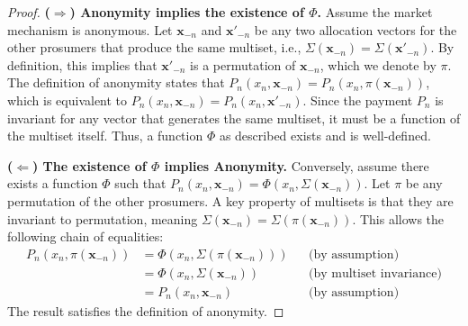 \documentclass[12pt, notitlepage]{article}
\begin{document}
\begin{proof}
\textbf{($\Rightarrow$) Anonymity implies the existence of $\Phi$.}
Assume the market mechanism is anonymous. Let $\bm{x}_{-n}$ and $\bm{x}'_{-n}$ be any two allocation vectors for the other prosumers that produce the same multiset, i.e., $\Sigma(\bm{x}_{-n}) = \Sigma(\bm{x}'_{-n})$. By definition, this implies that $\bm{x}'_{-n}$ is a permutation of $\bm{x}_{-n}$, which we denote by $\pi$. The definition of anonymity states that $P_n(x_n, \bm{x}_{-n}) = P_n(x_n, \pi(\bm{x}_{-n}))$, which is equivalent to $P_n(x_n, \bm{x}_{-n}) = P_n(x_n, \bm{x}'_{-n})$. Since the payment $P_n$ is invariant for any vector that generates the same multiset, it must be a function of the multiset itself. Thus, a function $\Phi$ as described exists and is well-defined.

\vspace{\baselineskip}

\noindent\textbf{($\Leftarrow$) The existence of $\Phi$ implies Anonymity.}
Conversely, assume there exists a function $\Phi$ such that $P_n(x_n, \bm{x}_{-n}) = \Phi(x_n, \Sigma(\bm{x}_{-n}))$. Let $\pi$ be any permutation of the other prosumers. A key property of multisets is that they are invariant to permutation, meaning $\Sigma(\bm{x}_{-n}) = \Sigma(\pi(\bm{x}_{-n}))$. This allows the following chain of equalities:
\begin{align*}
P_n(x_n, \pi(\bm{x}_{-n})) &= \Phi(x_n, \Sigma(\pi(\bm{x}_{-n}))) && \text{(by assumption)} \\
&= \Phi(x_n, \Sigma(\bm{x}_{-n})) && \text{(by multiset invariance)} \\
&= P_n(x_n, \bm{x}_{-n}) && \text{(by assumption)}
\end{align*}
The result satisfies the definition of anonymity.
\end{proof}
\end{document}
